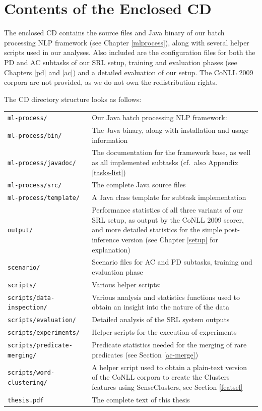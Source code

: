 \documentclass[12pt,notitlepage,a4paper]{report}
\begin{document}
\chapter{Contents of the Enclosed CD}\label{cd-contents}

\normalsize
The enclosed CD contains the source files and Java binary of our batch processing NLP framework (see Chapter \ref{mlprocess}), along with several helper scripts used in our analyses. Also included are the configuration files for both the PD and AC subtasks of our SRL setup, training and evaluation phases (see Chapters \ref{pd} and \ref{ac}) and a detailed evaluation of our setup. The CoNLL 2009 corpora are not provided, as we do not own the redistribution rights.

The CD directory structure looks as follows:
\footnotesize
\renewcommand{\arraystretch}{1.5}
\begin{longtable}{p{}p{}}
\tt ml-process/ & Our Java batch processing NLP framework: \\
\tt ml-process/bin/ & The Java binary, along with installation and usage information \\
\tt ml-process/javadoc/ & The documentation for the framework base, as well as all implemented subtasks (cf.\ also Appendix \ref{tasks-list}) \\
\tt ml-process/src/ & The complete Java source files \\
\tt ml-process/template/ & A Java class template for subtask implementation \\
\tt output/ & Performance statistics of all three variants of our SRL setup, as output by the CoNLL 2009 scorer, and more detailed statistics for the simple post-inference version (see Chapter \ref{setup} for explanation) \\
\tt scenario/ & Scenario files for AC and PD subtasks, training and evaluation phase \\
\tt scripts/ & Various helper scripts: \\
\tt scripts/data-inspection/ & Various analysis and statistics functions used to obtain an insight into the nature of the data \\
\tt scripts/evaluation/ & Detailed analysis of the SRL system outputs \\
\tt scripts/experiments/ & Helper scripts for the execution of experiments \\
\tt scripts/predicate-merging/ & Predicate statistics needed for the merging of rare predicates (see Section \ref{ac-merge}) \\
\tt scripts/word-clustering/ & A helper script used to obtain a plain-text version of the CoNLL corpora to create the Clusters features using SenseClusters, see Section \ref{featsel} \\
\tt thesis.pdf & The complete text of this thesis \\
\end{longtable}
\end{document}
